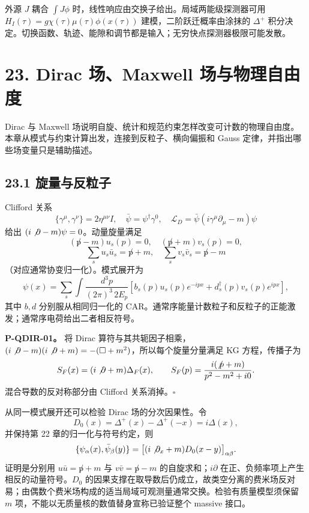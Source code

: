 \documentclass[
  11pt,
  oneside]{book}
\begin{document}
外源 \(J\) 耦合 \(\int J\phi\)
时，线性响应由交换子给出。局域两能级探测器可用
\(H_I(\tau)=g\chi(\tau)\mu(\tau)\phi(x(\tau))\)
建模，二阶跃迁概率由涂抹的 \(\Delta^+\)
积分决定。切换函数、轨迹、能隙和调节都是输入；无穷快点探测器极限可能发散。

\chapter{23. Dirac 场、Maxwell 场与物理自由度}\label{ch-23}\hypertarget{ch-23}{}

Dirac 与 Maxwell
场说明自旋、统计和规范约束怎样改变可计数的物理自由度。本章从模式与约束计算出发，连接到反粒子、横向偏振和
Gauss 定律，并指出哪些场变量只是辅助描述。

\section{23.1 旋量与反粒子}

Clifford 关系 \[
\{\gamma^\mu,\gamma^\nu\}=2\eta^{\mu\nu}I,\quad
\bar\psi=\psi^\dagger\gamma^0,\quad
\mathcal L_D=\bar\psi(i\gamma^\mu\partial_\mu-m)\psi
\] 给出 \((i\not\partial-m)\psi=0\)。动量旋量满足 \[
(\not p-m)u_s(p)=0,\quad(\not p+m)v_s(p)=0,
\] \[
\sum_su_s\bar u_s=\not p+m,\quad
\sum_sv_s\bar v_s=\not p-m
\] （对应通常协变归一化）。模式展开为 \[
\psi(x)=\sum_s\int\frac{d^3p}{(2\pi)^3\,2E_p}
\left[b_s(p)u_s(p)e^{-ipx}+d_s^\dagger(p)v_s(p)e^{ipx}\right],
\] 其中 \(b,d\) 分别服从相同归一化的
CAR。通常序能量计数粒子和反粒子的正能激发；通常序电荷给出二者相反符号。

\protect\hypertarget{p-qdir-01}{}{}

\textbf{P-QDIR-01。} 将 Dirac 算符与其共轭因子相乘，
\((i\not\partial-m)(i\not\partial+m)=-(\Box+m^2)\)，所以每个旋量分量满足
KG 方程，传播子为 \[
S_F(x)=(i\not\partial+m)\Delta_F(x),\qquad
S_F(p)=\frac{i(\not p+m)}{p^2-m^2+i0}.
\] 混合导数的反对称部分由 Clifford 关系消掉。\(\square\)

从同一模式展开还可以检验 Dirac 场的分次因果性。令 \[
D_0(x)=\Delta^+(x)-\Delta^+(-x)=i\Delta(x),
\] 并保持第 22 章的归一化与符号约定，则 \[
\{\psi_\alpha(x),\bar\psi_\beta(y)\}
=\bigl[(i\not\partial_x+m)D_0(x-y)\bigr]_{\alpha\beta}.
\] 证明是分别用 \(u\bar u=\not p+m\) 与 \(v\bar v=\not p-m\)
的自旋求和；\(i\partial\) 在正、负频率项上产生相反的动量符号。\(D_0\)
的因果支撑在取导数后仍成立，故类空分离的费米场反对易；由偶数个费米场构成的适当局域可观测量通常交换。检验有质量模型须保留
\(m\) 项，不能以无质量核的数值替身宣称已验证整个 massive 接口。
\end{document}
